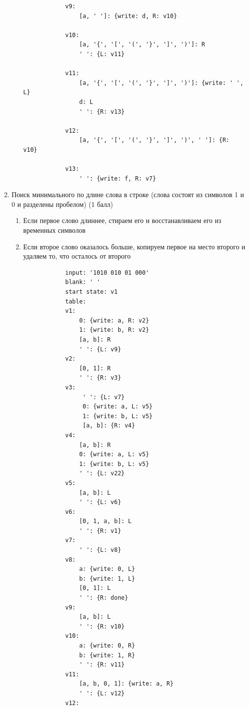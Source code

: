 \documentclass{article}
\begin{document}
\begin{enumerate}
\begin{enumerate}
\begin{lstlisting}
            v9:
                [a, ' ']: {write: d, R: v10}

            v10:
                [a, '{', '[', '(', '}', ']', ')']: R
                ' ': {L: v11}

            v11: 
                [a, '{', '[', '(', '}', ']', ')']: {write: ' ', L}
                d: L
                ' ': {R: v13}

            v12:
                [a, '{', '[', '(', '}', ']', ')', ' ']: {R: v10}

            v13:
                ' ': {write: f, R: v7}
        \end{lstlisting}
    \end{enumerate} 
    
    \item Поиск минимального по длине слова в строке (слова состоят из символов 1 и 0 и разделены пробелом) (1 балл)
    \begin{enumerate}
        \item Если первое слово длиннее, стираем его и восстанавливаем его из временных символов
        \item Если второе слово оказалось больше, копируем первое на место второго и удаляем то, что осталось от второго
        \begin{lstlisting}
            input: '1010 010 01 000'
            blank: ' '
            start state: v1
            table:
            v1:
                0: {write: a, R: v2}
                1: {write: b, R: v2}
                [a, b]: R
                ' ': {L: v9}
            v2:
                [0, 1]: R
                ' ': {R: v3}
            v3:
                 ' ': {L: v7}
                 0: {write: a, L: v5}
                 1: {write: b, L: v5}
                 [a, b]: {R: v4}
            v4:
                [a, b]: R
                0: {write: a, L: v5}
                1: {write: b, L: v5}
                ' ': {L: v22}
            v5:
                [a, b]: L
                ' ': {L: v6}
            v6:
                [0, 1, a, b]: L
                ' ': {R: v1}
            v7:
                ' ': {L: v8}
            v8:
                a: {write: 0, L}
                b: {write: 1, L}
                [0, 1]: L
                ' ': {R: done}
            v9:
                [a, b]: L
                ' ': {R: v10}
            v10:
                a: {write: 0, R}
                b: {write: 1, R}
                ' ': {R: v11}
            v11:
                [a, b, 0, 1]: {write: a, R}
                ' ': {L: v12}
            v12:

\end{lstlisting}
\end{enumerate}
\end{enumerate}
\end{document}
